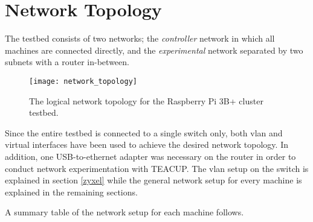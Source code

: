\section{Network Topology} \label{topology}

The testbed consists of two networks; the \textit{controller} network in which all machines are connected directly, and the \textit{experimental} network separated by two subnets with a router in-between.

\begin{figure}[H]
    \centering
    \texttt{[image: network\_topology]}
    \captionsetup{width=0.8\linewidth}
    \caption{The logical network topology for the Raspberry Pi 3B+ cluster testbed.}
    \label{fig:network_topology}
\end{figure}

Since the entire testbed is connected to a single switch only, both \gls{vlan} and virtual interfaces have been used to achieve the desired network topology. In addition, one USB-to-ethernet adapter was necessary on the router in order to conduct network experimentation with TEACUP. The \gls{vlan} setup on the switch is explained in section \ref{zyxel} while the general network setup for every machine is explained in the remaining sections.

A summary table of the network setup for each machine follows.

